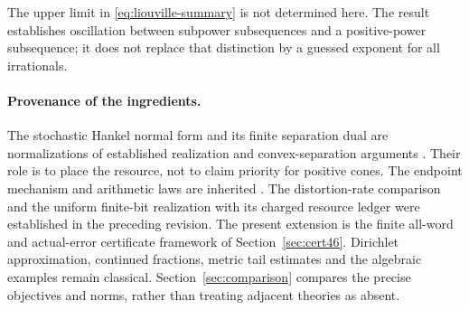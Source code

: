 The upper limit in \eqref{eq:liouville-summary} is not determined here. The result establishes oscillation between subpower subsequences and a positive-power subsequence; it does not replace that distinction by a guessed exponent for all irrationals.


\paragraph{Provenance of the ingredients.}
The stochastic Hankel normal form and its finite separation dual are
normalizations of established realization and convex-separation
arguments \cite{BF04,Ohta20,BPP15}. Their role is to place the resource,
not to claim priority for positive cones. The endpoint mechanism and
arithmetic laws are inherited \cite{GTF35,GTF42,GTF43}. The distortion-rate comparison and the uniform finite-bit
realization with its charged resource ledger were established in the
preceding revision. The present extension is the finite all-word and
actual-error certificate framework of Section~\ref{sec:cert46}. Dirichlet approximation,
continued fractions, metric tail estimates and the algebraic examples
remain classical. Section~\ref{sec:comparison} compares the precise
objectives and norms, rather than treating adjacent theories as absent.
